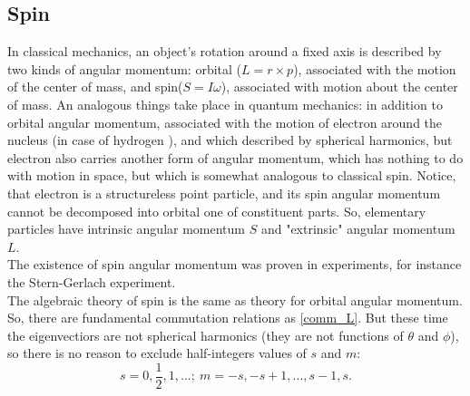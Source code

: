 \documentclass[a4paper, 12pt]{article}
\begin{document}



\subsection{Spin}
In classical mechanics, an object's rotation around a fixed axis  is described by two kinds of angular momentum: orbital ($L = r \times p$), associated with the motion of the center of mass, and spin($S = I \omega$), associated with motion about the center of mass. An analogous things take place in quantum mechanics: in addition to orbital angular momentum, associated with the motion of electron around the nucleus (in case of hydrogen ), and which  described by spherical harmonics, but electron also carries another form of angular momentum, which has nothing to do with motion in space, but which is somewhat analogous to classical spin. Notice, that electron is a structureless point particle, and its spin angular momentum cannot be decomposed into orbital one of constituent parts. So, elementary particles have intrinsic angular momentum $S$ and "extrinsic" angular momentum $L.$\\
The existence of spin angular momentum was proven in experiments, for instance the Stern-Gerlach experiment.\\
The algebraic  theory of spin is the same as theory for orbital angular momentum. So, there are fundamental commutation relations as \eqref{comm_L}.
But these time the eigenvectiors are not spherical harmonics (they are not functions of $\theta$ and $\phi$), so there is no reason to exclude half-integers values of $s$ and $m$:
$$s = 0, \frac{1}{2}, 1, ...;  ~ m = -s, -s+1,...,s-1, s. $$
\end{document}
